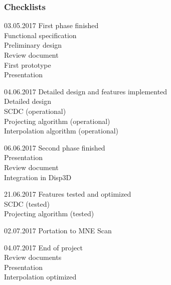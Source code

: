 \subsubsection{Checklists}
\begin{aims}
	\item[03.05.2017]First phase finished\\ Functional specification\\ Preliminary design\\Review document\\ First prototype\\Presentation
	\item[04.06.2017]Detailed design and features implemented\\ Detailed design\\SCDC (operational)\\Projecting algorithm (operational)\\Interpolation algorithm (operational)
	\item[06.06.2017]Second phase finished\\ Presentation\\Review document\\Integration in Disp3D
	\item[21.06.2017]Features tested and optimized\\ SCDC (tested)\\Projecting algorithm (tested)
	\item[02.07.2017] Portation to MNE Scan
	\item[04.07.2017]End of project\\ Review documents\\Presentation\\Interpolation optimized


\end{aims}
